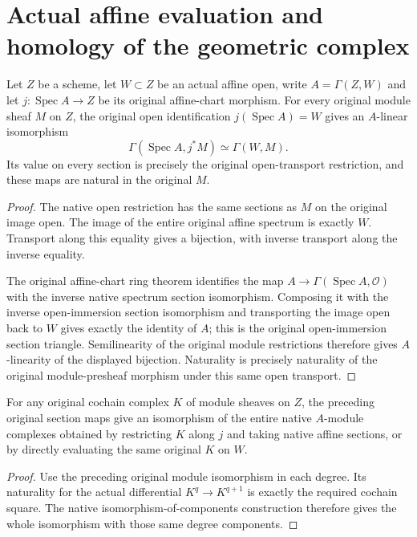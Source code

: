 \section{Actual affine evaluation and homology of the geometric complex}

\begin{lemma}
\label{lem:cartier-geometric-affine-module-sections}
\leanok
{}
Let $Z$ be a scheme, let $W\subset Z$ be an actual affine open,
write $A=\Gamma(Z,W)$ and let $j:\operatorname{Spec}A\to Z$ be its
original affine-chart morphism. For every original module sheaf $M$
on $Z$, the original open identification $j(\operatorname{Spec}A)=W$
gives an $A$-linear isomorphism
\[
 \Gamma(\operatorname{Spec}A,j^*M)\simeq\Gamma(W,M).
\]
Its value on every section is precisely the original open-transport
restriction, and these maps are natural in the original $M$.
\end{lemma}
\begin{proof}
The native open restriction has the same sections as $M$ on the
original image open. The image of the entire original affine
spectrum is exactly $W$. Transport along this equality gives a
bijection, with inverse transport along the inverse equality.

The original affine-chart ring theorem identifies the map
$A\to\Gamma(\operatorname{Spec}A,\mathcal O)$ with the inverse native
spectrum section isomorphism. Composing it with the inverse
open-immersion section isomorphism and transporting the image open
back to $W$ gives exactly the identity of $A$; this is the original
open-immersion section triangle. Semilinearity of the original
module restrictions therefore gives $A$-linearity of the displayed
bijection. Naturality is precisely naturality of the original
module-presheaf morphism under this same open transport.
\end{proof}

\begin{lemma}
\label{lem:cartier-geometric-affine-section-complex}
\leanok
{}
For any original cochain complex $K$ of module sheaves on $Z$, the
preceding original section maps give an isomorphism of the entire
native $A$-module complexes obtained by restricting $K$ along $j$
and taking native affine sections, or by directly evaluating the
same original $K$ on $W$.
\end{lemma}
\begin{proof}
Use the preceding original module isomorphism in each degree.
Its naturality for the actual differential $K^q\to K^{q+1}$ is
exactly the required cochain square. The native
isomorphism-of-components construction therefore gives the whole
isomorphism with those same degree components.
\end{proof}

